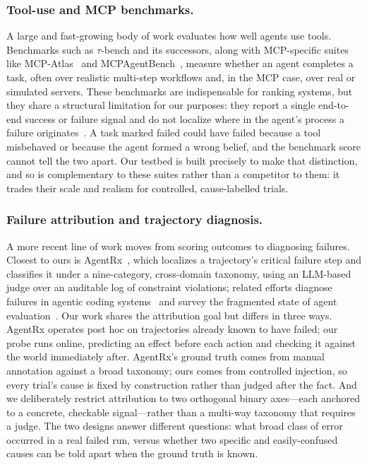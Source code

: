 \documentclass[runningheads]{llncs}
\begin{document}
\subsubsection{Tool-use and MCP benchmarks.}
A large and fast-growing body of work evaluates how well agents use tools. Benchmarks such as $\tau$-bench and its successors, along with MCP-specific suites like MCP-Atlas~\cite{mcpatlas} and MCPAgentBench~\cite{mcpagentbench}, measure whether an agent completes a task, often over realistic multi-step workflows and, in the MCP case, over real or simulated servers. These benchmarks are indispensable for ranking systems, but they share a structural limitation for our purposes: they report a single end-to-end success or failure signal and do not localize where in the agent's process a failure originates~\cite{agentprop}. A task marked failed could have failed because a tool misbehaved or because the agent formed a wrong belief, and the benchmark score cannot tell the two apart. Our testbed is built precisely to make that distinction, and so is complementary to these suites rather than a competitor to them: it trades their scale and realism for controlled, cause-labelled trials.

\subsubsection{Failure attribution and trajectory diagnosis.}
A more recent line of work moves from scoring outcomes to diagnosing failures. Closest to ours is AgentRx~\cite{agentrx}, which localizes a trajectory's critical failure step and classifies it under a nine-category, cross-domain taxonomy, using an LLM-based judge over an auditable log of constraint violations; related efforts diagnose failures in agentic coding systems~\cite{trajaudit} and survey the fragmented state of agent evaluation~\cite{agentatlas}. Our work shares the attribution goal but differs in three ways. AgentRx operates post hoc on trajectories already known to have failed; our probe runs online, predicting an effect before each action and checking it against the world immediately after. AgentRx's ground truth comes from manual annotation against a broad taxonomy; ours comes from controlled injection, so every trial's cause is fixed by construction rather than judged after the fact. And we deliberately restrict attribution to two orthogonal binary axes---each anchored to a concrete, checkable signal---rather than a multi-way taxonomy that requires a judge. The two designs answer different questions: what broad class of error occurred in a real failed run, versus whether two specific and easily-confused causes can be told apart when the ground truth is known.
\end{document}
